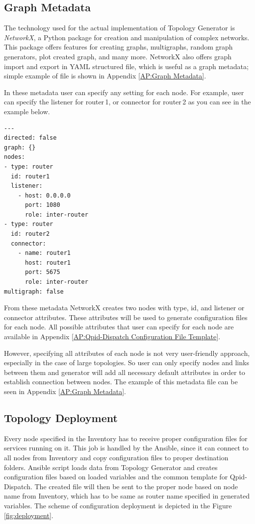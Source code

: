 
\subsection{Graph Metadata}
\label{Graph Metadata}
The technology used for the actual implementation of Topology Generator is \emph{NetworkX}, a Python package for creation and manipulation of complex networks. This package offers features for creating graphs, multigraphs, random graph generators, plot created graph, and many more. NetworkX also offers graph import and export in YAML structured file, which is useful as a graph metadata; simple example of file is shown in Appendix \ref{AP:Graph Metadata}.

In these metadata user can specify any setting for each node. For example, user can specify the listener for router\,1, or connector for router\,2 as you can see in the example below.

\begin{verbatim}
---
directed: false
graph: {}
nodes:
- type: router
  id: router1
  listener:
  	- host: 0.0.0.0
  	  port: 1080
  	  role: inter-router
- type: router
  id: router2
  connector:
  	- name: router1
  	  host: router1
  	  port: 5675
  	  role: inter-router
multigraph: false
\end{verbatim}
From these metadata NetworkX creates two nodes with type, id, and listener or connector attributes. These attributes will be used to generate configuration files for each node. All possible attributes that user can specify for each node are available in Appendix \ref{AP:Qpid-Dispatch Configuration File Template}.

However, specifying all attributes of each node is not very user-friendly approach, especially in the case of large topologies. So user can only specify nodes and links between them and generator will add all necessary default attributes in order to establish connection between nodes. The example of this metadata file can be seen in Appendix \ref{AP:Graph Metadata}.

\subsection{Topology Deployment}
Every node specified in the Inventory has to receive proper configuration files for services running on it. This job is handled by the Ansible, since it can connect to all nodes from Inventory and copy configuration files to proper destination folders. Ansible script loads data from Topology Generator and creates configuration files based on loaded variables and the common template for Qpid-Dispatch. The created file will then be sent to the proper node based on node name from Inventory, which has to be same as router name specified in generated variables. The scheme of configuration deployment is depicted in the Figure \ref{fig:deployment}.

